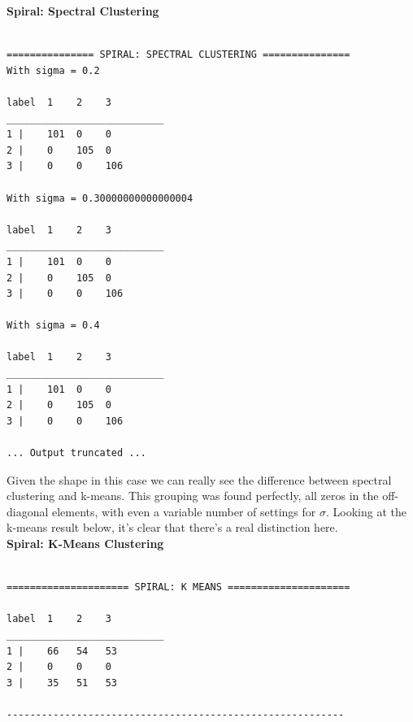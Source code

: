 \documentclass[11pt]{article}
\begin{document}
\textbf{Spiral: Spectral Clustering} 
\begin{verbatim}

=============== SPIRAL: SPECTRAL CLUSTERING ===============
With sigma = 0.2

label  1    2    3    
___________________________
1 |    101  0    0    
2 |    0    105  0    
3 |    0    0    106    

With sigma = 0.30000000000000004

label  1    2    3    
___________________________
1 |    101  0    0    
2 |    0    105  0    
3 |    0    0    106    

With sigma = 0.4

label  1    2    3    
___________________________
1 |    101  0    0    
2 |    0    105  0    
3 |    0    0    106    

... Output truncated ... 	

\end{verbatim}
Given the shape in this case we can really see the difference between spectral clustering and k-means. This grouping was found perfectly, all zeros in the off-diagonal elements, with even a variable number of settings for $\sigma$. Looking at the k-means result below, it's clear that there's a real distinction here.
\\[5pt]
\textbf{Spiral: K-Means Clustering} 
\begin{verbatim}

===================== SPIRAL: K MEANS =====================

label  1    2    3    
___________________________
1 |    66   54   53    
2 |    0    0    0    
3 |    35   51   53    

----------------------------------------------------------

\end{verbatim}
\end{document}
